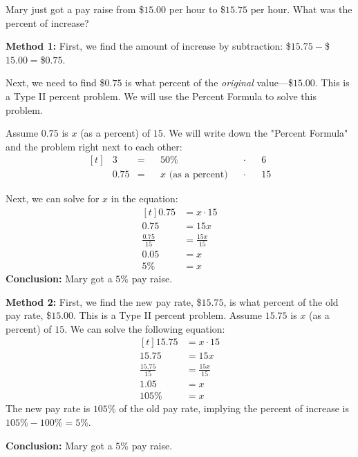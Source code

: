 \begin{myexample}
Mary just got a pay raise from \$$15.00$ per hour to \$$15.75$ per hour. What was the percent of increase?
\end{myexample}
\begin{solution}

\textbf{Method 1:} First, we find the amount of increase by subtraction: \$$15.75-$\$$15.00=$\$$0.75$.

Next, we need to find \$$0.75$ is what percent of the \textit{original} value---\$$15.00$. This is a Type II percent problem. We will use the Percent Formula to solve this problem.

Assume $0.75$ is $x$ (as a percent) of $15$. We will write down the "Percent Formula" and the problem right next to each other:
\[
\begin{aligned}[t]
	&3 &= &&50\% &&\cdot &&6 \\
	&0.75 &= &&x \text{ (as a percent)} &&\cdot &&15
\end{aligned}
\]

Next, we can solve for $x$ in the equation:
\[
\begin{aligned}[t]
	0.75 &= x \cdot 15 \\
	0.75 &= 15x \\
	\frac{0.75}{15} &= \frac{15x}{15} \\
	0.05 &= x \\
	5\% &= x
\end{aligned}
\]
\textbf{Conclusion: } Mary got a $5\%$ pay raise.

\textbf{Method 2: } First, we find the new pay rate, \$$15.75$, is what percent of the old pay rate, \$$15.00$. This is a Type II percent problem. Assume $15.75$ is $x$ (as a percent) of $15$. We can solve the following equation:
\[
\begin{aligned}[t]
	15.75 &= x \cdot 15 \\
	15.75 &= 15x \\
	\frac{15.75}{15} &= \frac{15x}{15} \\
	1.05 &= x \\
	105\% &= x
\end{aligned}
\]
The new pay rate is $105\%$ of the old pay rate, implying the percent of increase is $105\%-100\%=5\%$.

\textbf{Conclusion: } Mary got a $5\%$ pay raise.

\end{solution}

